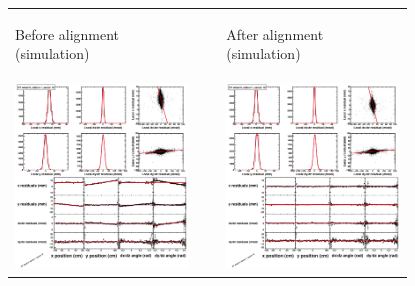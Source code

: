 \begin{figure}[p]
\centering
\begin{tabular}{p{0.47\linewidth} c p{0.47\linewidth}}
\begin{center}Before alignment (simulation)\end{center} & & \begin{center}After alignment (simulation)\end{center} \\
\includegraphics[width=\linewidth]{exampleMC_wh0st1sec10_before.eps} & &
\includegraphics[width=\linewidth]{exampleMC_wh0st1sec10_after.eps}

\end{tabular}
\end{figure}
